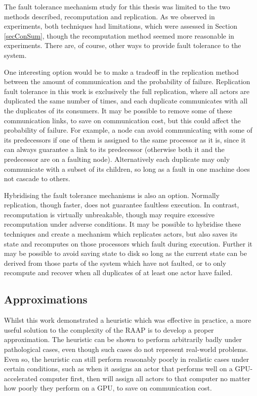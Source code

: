 The fault tolerance mechanism study for this thesis was limited to the two methods described, recomputation and replication.
As we observed in experiments, both techniques had limitations, which were assessed in Section \ref{secConSum}, though the recomputation method seemed more reasonable in experiments.
There are, of course, other ways to provide fault tolerance to the system.

One interesting option would be to make a tradeoff in the replication method between the amount of communication and the probability of failure.
Replication fault tolerance in this work is exclusively the full replication, where all actors are duplicated the same number of times, and each duplicate communicates with all the duplicates of its consumers.
It may be possible to remove some of these communication links, to save on communication cost, but this could affect the probability of failure.
For example, a node can avoid communicating with some of its predecessors if one of them is assigned to the same processor as it is, since it can always guarantee a link to its predecessor (otherwise both it and the predecessor are on a faulting node).
Alternatively each duplicate may only communicate with a subset of its children, so long as a fault in one machine does not cascade to others.

Hybridising the fault tolerance mechanisms is also an option.
Normally replication, though faster, does not guarantee faultless execution.
In contrast, recomputation is virtually unbreakable, though may require excessive recomputation under adverse conditions.
It may be possible to hybridise these techniques and create a mechanism which replicates actors, but also saves its state and recomputes on those processors which fault during execution.
Further it may be possible to avoid saving state to disk so long as the current state can be derived from those parts of the system which have not faulted, or to only recompute and recover when all duplicates of at least one actor have failed.

\subsection{Approximations}

Whilst this work demonstrated a heuristic which was effective in practice, a more useful solution to the complexity of the RAAP is to develop a proper approximation.
The heuristic can be shown to perform arbitrarily badly under pathological cases, even though such cases do not represent real-world problems.
Even so, the heuristic can still perform reasonably poorly in realistic cases under certain conditions, such as when it assigns an actor that performs well on a GPU-accelerated computer first, then will assign all actors to that computer no matter how poorly they perform on a GPU, to save on communication cost.

